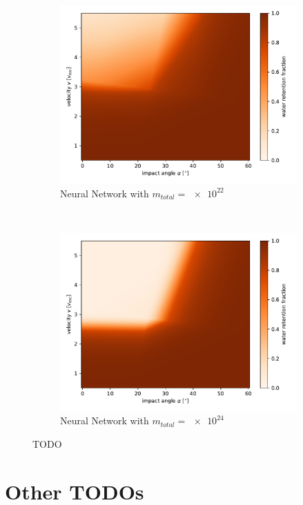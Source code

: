 \begin{figure}
\begin{subfigure}[t]{0.5\textwidth}
	\includegraphics[width=\linewidth]{images/plots/mass_nn1.pdf}
	\caption{Neural Network  with $m_{total}=\num{e22}$}
	\label{fig:mass_nn1}
\end{subfigure}%
~ 
\begin{subfigure}[t]{0.5\textwidth}
	\centering
	\includegraphics[width=\linewidth]{images/plots/mass_nn2.pdf}
	\caption{Neural Network  with $m_{total}=\num{e24}$}
	\label{fig:mass_nn2}
\end{subfigure}
	\caption{TODO}
	\label{fig:mass_results}
\end{figure}




\chapter{Other TODOs}



\printbibliography




